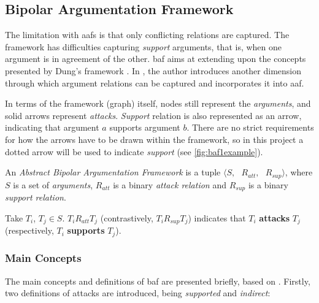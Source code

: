     \subsection{Bipolar Argumentation Framework}
        The limitation with \gls{aaf}s is that only conflicting relations are captured. The framework has difficulties capturing \textit{support} arguments, that is, when one argument is in agreement of the other. \gls{baf} aims at extending upon the concepts presented by Dung's framework \autocite{Dung1995OnTA}. In \autocite{Cayrol2005OnTA}, the author introduces another dimension through which argument relations can be captured and incorporates it into \gls{aaf}. 
        
        In terms of the framework (graph) itself, nodes still represent the \textit{arguments}, and solid arrows represent \textit{attacks}. \textit{Support} relation is also represented as an arrow, indicating that argument $a$ supports argument $b$. There are no strict requirements for how the arrows have to be drawn within the framework, so in this project a dotted arrow will be used to indicate \textit{support} (see \autoref{fig:baf1example}).
        
        \begin{definition}
            An \textit{Abstract Bipolar Argumentation Framework} is a tuple $\langle S, \text{ }R_{att}, \text{ }R_{sup} \rangle$, where $S$ is a set of \textit{arguments},  $R_{att}$ is a binary \textit{attack relation} and $R_{sup}$ is a binary \textit{support relation}.
            \label{definition:definition10}
        \end{definition}
        \begin{exa}
            Take $T_{i}$, $T_{j} \in S$. $T_{i}R_{att}T_{j}$ (contrastively, $T_{i}R_{sup}T_{j}$) indicates that $T_{i}$ \textbf{attacks} $T_{j}$ (respectively, $T_{i}$ \textbf{supports} $T_{j}$).
            \label{exa:example10}
        \end{exa}
        
        
        
        \subsubsection{Main Concepts}
            The main concepts and definitions of \gls{baf} are presented briefly, based on \autocite{Cayrol2005OnTA}. Firstly, two definitions of attacks are introduced, being \textit{supported} and \textit{indirect}:
            

